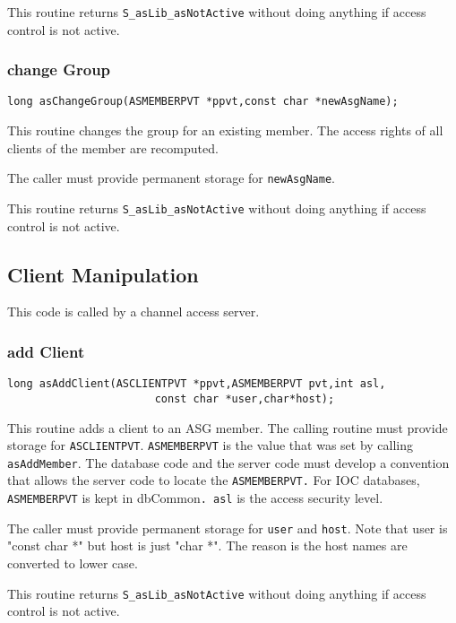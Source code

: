 This routine returns \verb|S_asLib_asNotActive| without doing anything if access control is not active.

\subsubsection{change Group}

\begin{verbatim}long asChangeGroup(ASMEMBERPVT *ppvt,const char *newAsgName);
\end{verbatim}This routine changes the group for an existing member. The access rights of all clients of the member are recomputed.

The caller must provide permanent storage for \verb|newAsgName|.

This routine returns \verb|S_asLib_asNotActive| without doing anything if access control is not active.

\subsection{ Client Manipulation}

This code is called by a channel access server.

\subsubsection{add Client}

\begin{verbatim}long asAddClient(ASCLIENTPVT *ppvt,ASMEMBERPVT pvt,int asl,
                       const char *user,char*host);
\end{verbatim}This routine adds a client to an ASG member. The calling routine must provide storage for \verb|ASCLIENTPVT|. 
\verb|ASMEMBERPVT| is the value that was set by calling \verb|asAddMember|. The database code and the server code must develop 
a convention that allows the server code to locate the \verb|ASMEMBERPVT.| For IOC databases,  \verb|ASMEMBERPVT| is kept in 
dbCommon\verb|. asl| is the access security level.

The caller must provide permanent storage for \verb|user| and \verb|host|. Note that user is "const char *" but host is just "char *". 
The reason is the host names are converted to lower case.

This routine returns \verb|S_asLib_asNotActive| without doing anything if access control is not active.

